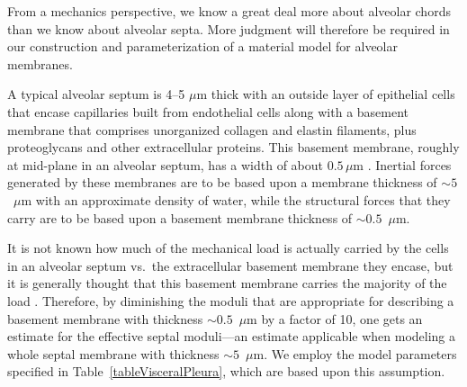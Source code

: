 From a mechanics perspective, we know a great deal more about alveolar chords than we know about alveolar septa.  More judgment will therefore be required in our construction and parameterization of a material model for alveolar membranes.  

A typical alveolar septum is 4--5 $\mu$m thick \cite{Sukietal11} with an outside layer of epithelial cells that encase capillaries built from endothelial cells along with a basement membrane that comprises unorganized collagen and elastin filaments, plus proteoglycans and other extracellular proteins.  This basement membrane, roughly at mid-plane in an alveolar septum, has a width of about $0.5 \, \mu$m \cite{RoanWaters11}.  Inertial forces generated by these membranes are to be based upon a membrane thickness of $\sim\!\!5$~$\mu$m with an approximate density of water, while the structural forces that they carry are to be based upon a basement membrane thickness of $\sim\!\! 0.5$~$\mu$m.  

It is not known how much of the mechanical load is actually carried by the cells in an alveolar septum vs.\ the extracellular basement membrane they encase, but it is generally thought that this basement membrane carries the majority of the load \cite{Sukietal11}.  Therefore, by diminishing the moduli that are appropriate for describing a basement membrane with thickness $\sim \! \! \! 0.5$~$\mu$m by a factor of 10, one gets an estimate for the effective septal moduli---an estimate applicable when modeling a whole septal membrane with thickness $\sim \! \! \! 5$~$\mu$m.  We employ the model parameters specified in Table~\ref{tableVisceralPleura}, which are based upon this assumption.

